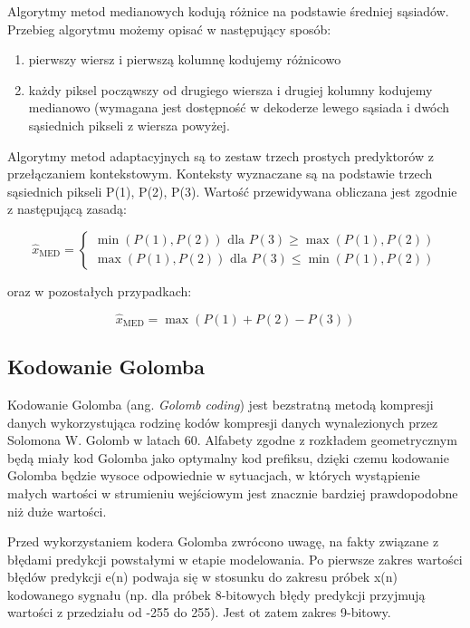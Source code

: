 \documentclass{article}
\begin{document}
Algorytmy metod medianowych kodują różnice na podstawie średniej sąsiadów. Przebieg algorytmu możemy opisać w następujący sposób:
\begin{enumerate}
 \item pierwszy wiersz i pierwszą kolumnę kodujemy różnicowo
 \item każdy piksel począwszy od drugiego wiersza i drugiej kolumny kodujemy medianowo (wymagana jest dostępność w dekoderze lewego sąsiada i dwóch sąsiednich pikseli z wiersza powyżej.\cite{differential_coding}
\end{enumerate}


Algorytmy metod adaptacyjnych są to zestaw trzech prostych predyktorów z przełączaniem kontekstowym. Konteksty wyznaczane są na podstawie trzech sąsiednich pikseli P(1), P(2), P(3). Wartość przewidywana obliczana jest zgodnie z następującą zasadą:


\begin{equation}
\hat{x}_{\mathrm{MED}}=\left\{\begin{array}{l}
\min (P(1), P(2)) \text{ dla } P(3) \geq \max(P(1), P(2)) \\
\max (P(1), P(2)) \text{ dla } P(3) \leq \min(P(1), P(2))
\end{array}\right.
\end{equation}

oraz w pozostałych przypadkach: 


\begin{equation}
\hat{x}_{\mathrm{MED}}= \max(P(1) + P(2) - P(3))
\end{equation}

\subsection{Kodowanie Golomba}

Kodowanie Golomba (ang. \emph{Golomb coding}) jest bezstratną metodą kompresji danych wykorzystująca rodzinę kodów kompresji danych wynalezionych przez Solomona W. Golomb w latach 60. Alfabety zgodne z rozkładem geometrycznym będą miały kod Golomba jako optymalny kod prefiksu, dzięki czemu kodowanie Golomba będzie wysoce odpowiednie w sytuacjach, w których wystąpienie małych wartości w strumieniu wejściowym jest znacznie bardziej prawdopodobne niż duże wartości.

Przed wykorzystaniem kodera Golomba zwrócono uwagę, na fakty związane z błędami predykcji powstałymi w etapie modelowania. Po pierwsze zakres wartości błędów predykcji e(n) podwaja się w stosunku do zakresu próbek x(n) kodowanego sygnału (np. dla próbek 8-bitowych błędy predykcji przyjmują wartości z przedziału od -255 do 255). Jest ot zatem zakres 9-bitowy.
\end{document}
